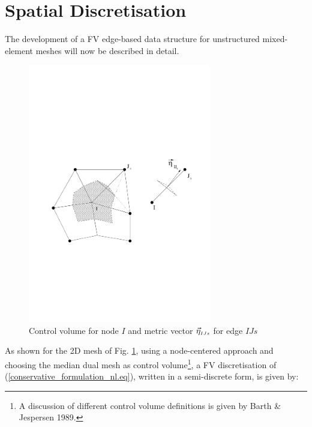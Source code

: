 %
%
%
\section{Spatial Discretisation}
\label{space_discretisation_nl.sec}
%
 The development of a FV edge-based data structure
 for unstructured mixed-element meshes
 will now be described in detail.

%
\begin{figure}[ht]
\centerline{\includegraphics[width=80mm,clip=t]{CHAP_NONLIN/FIGURE/mixme.pdf}}
\caption{Control volume for node $I$ and metric vector
$\vec{\eta}_{\mbox{\tiny $IJs$}}$
 for edge $IJs$}
\label{median_dual.fig}
\end{figure}
%
 As shown for the 2D mesh of Fig. \ref{median_dual.fig},
 using a node-centered approach and choosing the median dual mesh as control
 volume\footnote{A discussion of different control volume definitions is
 given by Barth \& Jespersen 1989.},
 a FV discretisation of
 (\ref{conservative_formulation_nl.eq}), written
 in a semi-discrete form, is given by:

